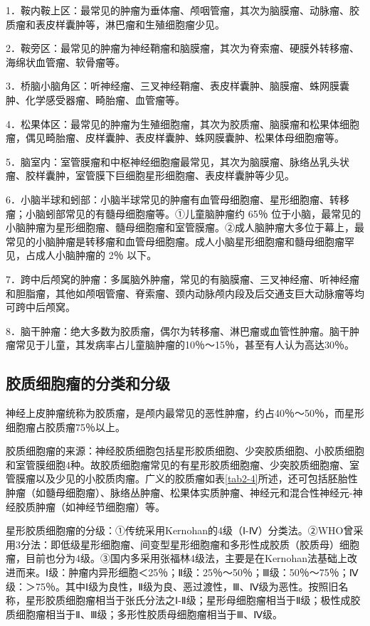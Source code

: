1．鞍内鞍上区：最常见的肿瘤为垂体瘤、颅咽管瘤，其次为脑膜瘤、动脉瘤、胶质瘤和表皮样囊肿等，淋巴瘤和生殖细胞瘤少见。

2．鞍旁区：最常见的肿瘤为神经鞘瘤和脑膜瘤，其次为脊索瘤、硬膜外转移瘤、海绵状血管瘤、软骨瘤等。

3．桥脑小脑角区：听神经瘤、三叉神经鞘瘤、表皮样囊肿、脑膜瘤、蛛网膜囊肿、化学感受器瘤、畸胎瘤、血管瘤等。

4．松果体区：最常见的肿瘤为生殖细胞瘤，其次为胶质瘤、脑膜瘤和松果体细胞瘤，偶见畸胎瘤、皮样囊肿、表皮样囊肿、蛛网膜囊肿、松果体母细胞瘤等。

5．脑室内：室管膜瘤和中枢神经细胞瘤最常见，其次为脑膜瘤、脉络丛乳头状瘤、胶样囊肿，室管膜下巨细胞星形细胞瘤、表皮样囊肿等少见。

6．小脑半球和蚓部：小脑半球常见的肿瘤有血管母细胞瘤、星形细胞瘤、转移瘤；小脑蚓部常见的有髓母细胞瘤等。①儿童脑肿瘤约
65％
位于小脑，最常见的小脑肿瘤为星形细胞瘤、髓母细胞瘤和室管膜瘤。②成人脑肿瘤大多位于幕上，最常见的小脑肿瘤是转移瘤和血管母细胞瘤。成人小脑星形细胞瘤和髓母细胞瘤罕见，占成人小脑肿瘤的
2％ 以下。

7．跨中后颅窝的肿瘤：多属脑外肿瘤，常见的有脑膜瘤、三叉神经瘤、听神经瘤和胆脂瘤，其他如颅咽管瘤、脊索瘤、颈内动脉颅内段及后交通支巨大动脉瘤等均可跨中后颅窝。

8．脑干肿瘤：绝大多数为胶质瘤，偶尔为转移瘤、淋巴瘤或血管性肿瘤。脑干肿瘤常见于儿童，其发病率占儿童脑肿瘤的10％～15％，甚至有人认为高达30％。

\subsection{胶质细胞瘤的分类和分级}

神经上皮肿瘤统称为胶质瘤，是颅内最常见的恶性肿瘤，约占40％～50％，而星形细胞瘤占胶质瘤75％以上。

胶质细胞瘤的来源：神经胶质细胞包括星形胶质细胞、少突胶质细胞、小胶质细胞和室管膜细胞4种。故胶质细胞瘤常见的有星形胶质细胞瘤、少突胶质细胞瘤、室管膜瘤以及少见的小胶质肉瘤。广义的胶质瘤如表\ref{tab2-4}所述，还可包括胚胎性肿瘤（如髓母细胞瘤）、脉络丛肿瘤、松果体实质肿瘤、神经元和混合性神经元-神经胶质肿瘤（如神经节细胞瘤）等。

星形胶质细胞瘤的分级：①传统采用Kernohan的4级（Ⅰ-Ⅳ）分类法。②WHO曾采用3分法：即低级星形细胞瘤、间变型星形细胞瘤和多形性成胶质（胶质母）细胞瘤，目前也分为4级。③国内多采用张福林4级法，主要是在Kernohan法基础上改进而来。Ⅰ级：肿瘤内异形细胞＜25％；Ⅱ级：25％～50％；Ⅲ级：50％～75％；Ⅳ级：＞75％。其中Ⅰ级为良性，Ⅱ级为良、恶过渡性，Ⅲ、Ⅳ级为恶性。按照旧名称，星形胶质细胞瘤相当于张氏分法之Ⅰ-Ⅱ级；星形母细胞瘤相当于Ⅱ级；极性成胶质细胞瘤相当于Ⅱ、Ⅲ级；多形性胶质母细胞瘤相当于Ⅲ、Ⅳ级。

